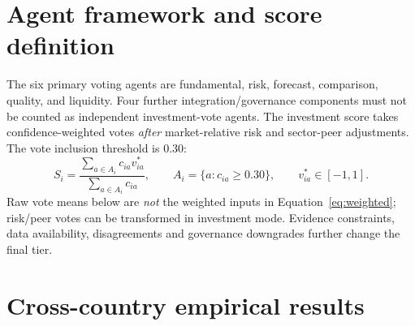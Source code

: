 \documentclass[11pt,a4paper]{article}
\begin{document}
\section{Agent framework and score definition}
The six primary voting agents are fundamental, risk, forecast, comparison, quality, and liquidity. Four further integration/governance components must not be counted as independent investment-vote agents. The investment score takes confidence-weighted votes \emph{after} market-relative risk and sector-peer adjustments. The vote inclusion threshold is 0.30:
\begin{equation}
S_i =
\frac{\sum_{a\in A_i} c_{ia} v_{ia}^{*}}
{\sum_{a\in A_i} c_{ia}}, \qquad
A_i = \{a:c_{ia}\geq0.30\},\qquad v_{ia}^{*}\in[-1,1].
\label{eq:weighted}
\end{equation}
Raw vote means below are \emph{not} the weighted inputs in Equation~\eqref{eq:weighted}; risk/peer votes can be transformed in investment mode. Evidence constraints, data availability, disagreements and governance downgrades further change the final tier.

\section{Cross-country empirical results}
\begin{table}[ht]
\centering\scriptsize
\caption{Ten-country final BUY/SELL decisions and entry-price completeness. Mean score and confidence are frozen engine outputs.}
\label{tab:markets}
\end{table}
\end{document}

